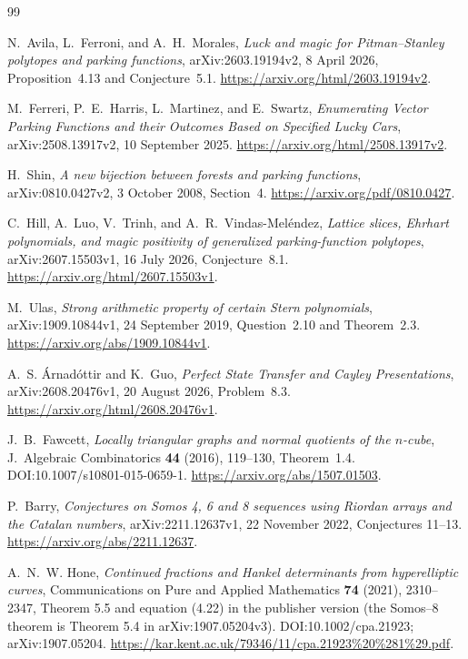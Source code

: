 \documentclass[11pt,a4paper]{article}
\theoremstyle{definition}
\theoremstyle{remark}
\begin{document}
\begin{thebibliography}{99}
\raggedright


N.~Avila, L.~Ferroni, and A.~H.~Morales,
\emph{Luck and magic for Pitman--Stanley polytopes and parking functions},
arXiv:2603.19194v2, 8 April 2026, Proposition~4.13 and Conjecture~5.1.
\url{https://arxiv.org/html/2603.19194v2}.

M.~Ferreri, P.~E.~Harris, L.~Martinez, and E.~Swartz,
\emph{Enumerating Vector Parking Functions and their Outcomes Based on
Specified Lucky Cars}, arXiv:2508.13917v2, 10 September 2025.
\url{https://arxiv.org/html/2508.13917v2}.

H.~Shin, \emph{A new bijection between forests and parking functions},
arXiv:0810.0427v2, 3 October 2008, Section~4.
\url{https://arxiv.org/pdf/0810.0427}.

C.~Hill, A.~Luo, V.~Trinh, and A.~R.~Vindas-Mel\'endez,
\emph{Lattice slices, Ehrhart polynomials, and magic positivity of
generalized parking-function polytopes}, arXiv:2607.15503v1,
16 July 2026, Conjecture~8.1.
\url{https://arxiv.org/html/2607.15503v1}.


M.~Ulas, \emph{Strong arithmetic property of certain Stern polynomials},
arXiv:1909.10844v1, 24 September 2019, Question~2.10 and Theorem~2.3.
\url{https://arxiv.org/abs/1909.10844v1}.

A.~S. \'{A}rnad\'ottir and K.~Guo,
\emph{Perfect State Transfer and Cayley Presentations},
arXiv:2608.20476v1, 20 August 2026, Problem~8.3.
\url{https://arxiv.org/html/2608.20476v1}.

J.~B.~Fawcett, \emph{Locally triangular graphs and normal quotients of
the $n$-cube}, J.~Algebraic Combinatorics \textbf{44} (2016), 119--130,
Theorem~1.4. DOI:10.1007/s10801-015-0659-1.
\url{https://arxiv.org/abs/1507.01503}.


P.~Barry, \emph{Conjectures on Somos 4, 6 and 8 sequences using Riordan
arrays and the Catalan numbers}, arXiv:2211.12637v1, 22 November 2022,
Conjectures 11--13. \url{https://arxiv.org/abs/2211.12637}.

A.~N.~W. Hone, \emph{Continued fractions and Hankel determinants from
hyperelliptic curves}, Communications on Pure and Applied Mathematics
\textbf{74} (2021), 2310--2347, Theorem 5.5 and equation (4.22) in the publisher version
(the Somos--8 theorem is Theorem 5.4 in arXiv:1907.05204v3).
DOI:10.1002/cpa.21923; arXiv:1907.05204.
\url{https://kar.kent.ac.uk/79346/11/cpa.21923%20%281%29.pdf}.



\end{thebibliography}
\end{document}
